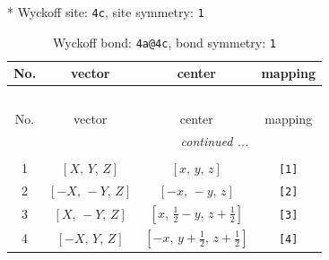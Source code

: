 \documentclass[fleqn,8pt]{jsarticle}
\begin{document}
* Wyckoff site: {\tt 4c}, site symmetry: {\tt 1}
\renewcommand{\arraystretch}{1.2}
\begin{longtable}{cccc}
\caption{Wyckoff bond: {\tt 4a@4c}, bond symmetry: {\tt 1}}
 \\
 \hline \hline
No. & vector & center & mapping \\ \hline \endfirsthead

\multicolumn{3}{l}{\tablename\ \thetable{}} \\
 \hline \hline
No. & vector & center & mapping \\ \hline \endhead

 \hline \hline
\multicolumn{3}{r}{\footnotesize\it continued ...} \\ \endfoot

 \hline \hline
\multicolumn{3}{r}{} \\ \endlastfoot

1 & $\left[ X,\, Y,\, Z \right]$ & $\left[ x,\, y,\, z \right]$ & {\tt [1]} \\ \hline
2 & $\left[ - X,\, - Y,\, Z \right]$ & $\left[ - x,\, - y,\, z \right]$ & {\tt [2]} \\ \hline
3 & $\left[ X,\, - Y,\, Z \right]$ & $\left[ x,\, \frac{1}{2} - y,\, z + \frac{1}{2} \right]$ & {\tt [3]} \\ \hline
4 & $\left[ - X,\, Y,\, Z \right]$ & $\left[ - x,\, y + \frac{1}{2},\, z + \frac{1}{2} \right]$ & {\tt [4]} \\
\end{longtable}
\end{document}
